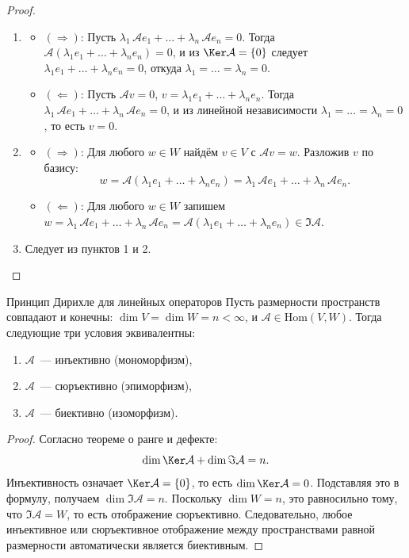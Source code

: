\begin{proof}
	\begin{enumerate}
		\item
		\begin{itemize}
			\item $(\Rightarrow)$: Пусть $\lambda_1\,\mathcal{A}e_1 + \ldots + \lambda_n\,\mathcal{A}e_n = 0$.
			Тогда $\mathcal{A}(\lambda_1 e_1 + \ldots + \lambda_n e_n) = 0$,
			и из $\Ker\mathcal{A} = \{0\}$ следует $\lambda_1 e_1 + \ldots + \lambda_n e_n = 0$,
			откуда $\lambda_1 = \ldots = \lambda_n = 0$.
			\item $(\Leftarrow)$: Пусть $\mathcal{A}v = 0$, $v = \lambda_1 e_1 + \ldots + \lambda_n e_n$.
			Тогда $\lambda_1\,\mathcal{A}e_1 + \ldots + \lambda_n\,\mathcal{A}e_n = 0$,
			и из линейной независимости $\lambda_1 = \ldots = \lambda_n = 0$, то есть $v = 0$.
		\end{itemize}
		\item
		\begin{itemize}
			\item $(\Rightarrow)$: Для любого $w \in W$ найдём $v \in V$ с $\mathcal{A}v = w$.
			Разложив $v$ по базису:
			\[
			w = \mathcal{A}(\lambda_1 e_1 + \ldots + \lambda_n e_n) = \lambda_1\,\mathcal{A}e_1 + \ldots + \lambda_n\,\mathcal{A}e_n.
			\]
			\item $(\Leftarrow)$: Для любого $w \in W$ запишем $w = \lambda_1\,\mathcal{A}e_1 + \ldots + \lambda_n\,\mathcal{A}e_n = \mathcal{A}(\lambda_1 e_1 + \ldots + \lambda_n e_n) \in \Im\mathcal{A}$.
		\end{itemize}
		\item Следует из пунктов 1 и 2.
	\end{enumerate}
\end{proof}

\begin{Statement}{Принцип Дирихле для линейных операторов}{}
	Пусть размерности пространств совпадают и конечны: $\dim V = \dim W = n < \infty$, и $\mathcal{A} \in \mathrm{Hom}(V, W)$.
	Тогда следующие три условия эквивалентны:
	\begin{enumerate}
		\item $\mathcal{A}$~--- инъективно (мономорфизм),
		\item $\mathcal{A}$~--- сюръективно (эпиморфизм),
		\item $\mathcal{A}$~--- биективно (изоморфизм).
	\end{enumerate}
\end{Statement}
\begin{proof}
	Согласно теореме о ранге и дефекте:
	\[
	\dim\Ker\mathcal{A} + \dim\Im\mathcal{A} = n.
	\]
	Инъективность означает $\Ker\mathcal{A} = \{0\}$, то есть $\dim\Ker\mathcal{A} = 0$.
	Подставляя это в формулу, получаем $\dim\Im\mathcal{A} = n$. Поскольку $\dim W = n$, это равносильно тому, что $\Im\mathcal{A} = W$, то есть отображение сюръективно.
	Следовательно, любое инъективное или сюръективное отображение между пространствами равной размерности автоматически является биективным.
\end{proof}
